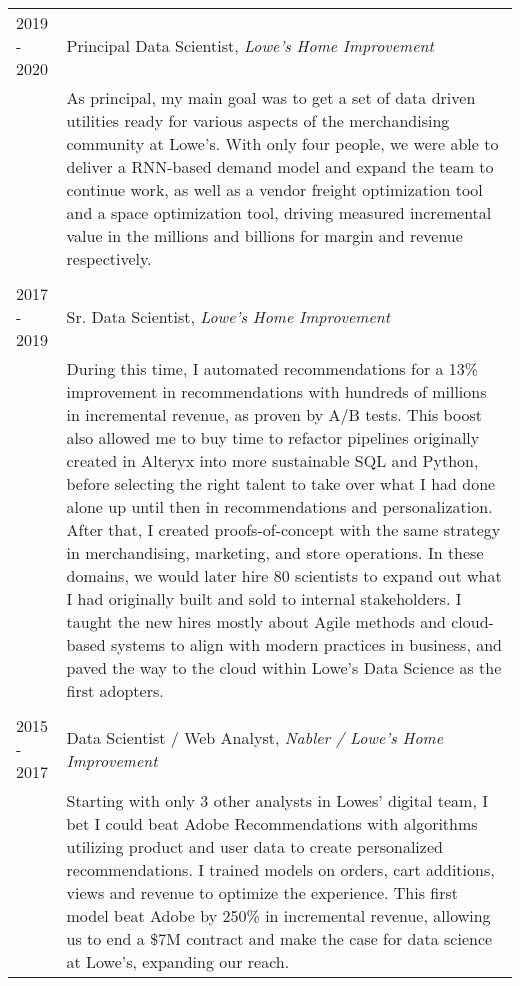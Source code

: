 \documentclass[a4paper, 9pt]{article} %
\begin{document}
\begin{tabular}{l|p{14cm}}
\textsc{2019 - 2020} & Principal Data Scientist, \emph{Lowe's Home Improvement} \\
& \footnotesize{As principal, my main goal was to get a set of data driven utilities ready for various aspects of the merchandising community at Lowe’s.
With only four people, we were able to deliver a RNN-based demand model and expand the team to continue work, as well as a vendor freight optimization tool and a space optimization tool, driving measured incremental value in the millions and billions for margin and revenue respectively.}\\

\multicolumn{2}{c}{} \\


\textsc{2017 - 2019} & Sr. Data Scientist, \emph{Lowe's Home Improvement} \\
& \footnotesize{During this time, I automated recommendations for a 13\% improvement in recommendations with hundreds of millions in incremental revenue, as proven by A/B tests. This boost also allowed me to buy time to refactor pipelines originally created in Alteryx into more sustainable SQL and Python, before selecting the right talent to take over what I had done alone up until then in recommendations and personalization. After that, I created proofs-of-concept with the same strategy in merchandising, marketing, and store operations. In these domains, we would later hire 80 scientists to expand out what I had originally built and sold to internal stakeholders. I taught the new hires mostly about Agile methods and cloud-based systems to align with modern practices in business, and paved the way to the cloud within Lowe's Data Science as the first adopters.}\\

\multicolumn{2}{c}{} \\


\textsc{2015 - 2017} & Data Scientist / Web Analyst, \emph{Nabler / Lowe's Home Improvement} \\
& \footnotesize{Starting with only 3 other analysts in Lowes’ digital team, I bet I could beat Adobe Recommendations with algorithms utilizing product and user data to create personalized recommendations. I trained models on orders, cart additions, views and revenue to optimize the experience. This first model beat Adobe by 250\% in incremental revenue, allowing us to end a \$7M contract and make the case for data science at Lowe’s, expanding our reach.}\\


\end{tabular}
\end{document}
